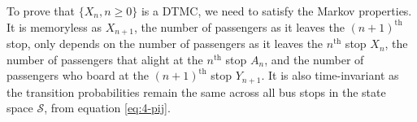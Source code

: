 \documentclass[12pt]{article}
\newcommand{\matindex}[1]{\mbox{\scriptsize#1}}%
\begin{document}
\noindent To prove that $\{X_n, n \geq 0\}$ is a DTMC, we need to satisfy the Markov properties. It is memoryless as $X_{n+1}$, the number of passengers as it leaves the $(n+1)^{\text{th}}$ stop, only depends on the number of passengers as it leaves the $n^{\text{th}}$ stop $X_n$, the number of passengers that alight at the $n^{\text{th}}$ stop $A_n$, and the number of passengers who board at the $(n+1)^{\text{th}}$ stop $Y_{n+1}$. It is also time-invariant as the transition probabilities remain the same across all bus stops in the state space $\mathcal{S}$, from equation \ref{eq:4-pij}. 


% 

\end{document}
